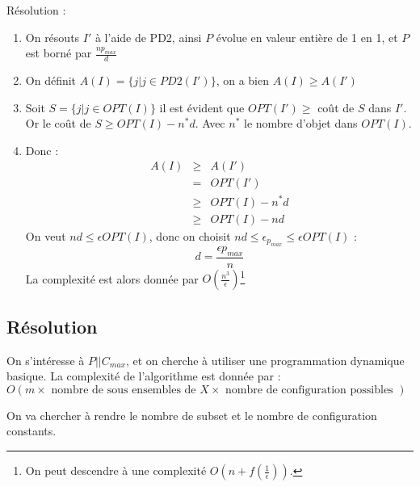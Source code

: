 \documentclass[a4paper, 11pt]{thesis}
\begin{document}
\begin{ex}
    Résolution : \begin{enumerate}
        \item On résouts $I'$ à l'aide de PD2, ainsi $P$ évolue en valeur entière de 1 en 1, et $P$
            est borné par $\frac{np_{max}}{d}$
        \item On définit $A(I) = \{ j | j \in PD2(I') \}$, on a bien $A(I) \geq A(I')$
        \item Soit $S = \{ j | j \in OPT(I) \}$ il est évident que $OPT(I') \geq$ coût de
            $S$ dans $I'$. Or le coût de $S \geq OPT(I) - n^*d$. Avec $n^*$ le nombre d'objet dans
            $OPT(I)$.
        \item Donc : \begin{displaymath}
                \begin{array}{rcl}
                    A(I) & \geq & A(I') \\
                         &   =  & OPT(I') \\
                         & \geq & OPT(I) - n^*d \\
                         & \geq & OPT(I) - nd
                \end{array}
            \end{displaymath}
            On veut $nd \leq \epsilon OPT(I)$, donc on choisit $nd \leq \epsilon_{p_{max}} \leq
            \epsilon OPT(I)$ : \begin{displaymath}
                d = \frac{\epsilon p_{max}}{n}
            \end{displaymath}
            La complexité est alors donnée par $O(\frac{n^3}{\epsilon})$\footnote{On peut descendre
            à une complexité $O(n + f(\frac{1}{\epsilon}))$.}
    \end{enumerate}
\end{ex}

\subsection{Résolution}

    On s'intéresse à $P||C_{max}$, et on cherche à utiliser une programmation dynamique basique.
    La complexité de l'algorithme est donnée par : $O(m \times \mbox{ nombre de sous ensembles de }X
    \times \mbox{ nombre de configuration possibles })$

    On va chercher à rendre le nombre de subset et le nombre de configuration constants.
\end{document}
